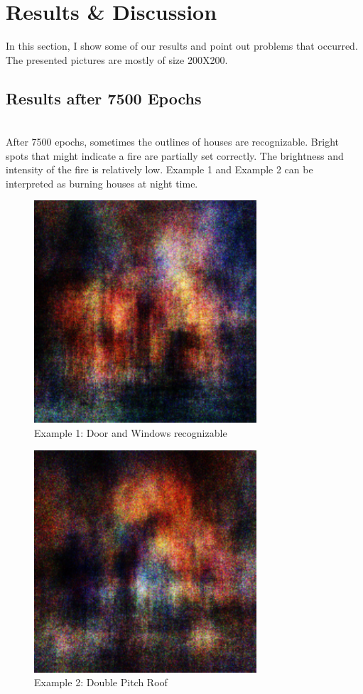 \section{Results \& Discussion}

    In this section, I show some of our results and point out problems that occurred. The presented pictures are mostly of size 200X200.
    \subsection{Results after 7500 Epochs}\\
    After 7500 epochs, sometimes the outlines of houses are recognizable. Bright spots that might indicate a fire are partially set correctly. The brightness and intensity of the fire is relatively low. Example 1 and Example 2 can be interpreted as burning houses at night time.

    \begin{figure}[htb!] 
    	\centering
    	\includegraphics[width=0.7\linewidth]{7500-1.pdf}
    	\caption{Example 1: Door and Windows recognizable}
    	\label{fig:7500-1}
    \end{figure}
    

    \begin{figure}[htb!] 
    	\centering
    	\includegraphics[width=0.7\linewidth]{7500-2.pdf}
    	\caption{Example 2: Double Pitch Roof}
    	\label{fig:7500-2}
    \end{figure}

